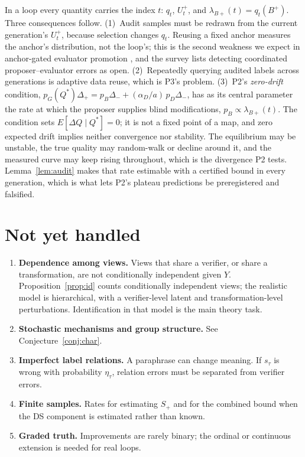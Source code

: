 \documentclass[11pt]{article}
\theoremstyle{definition}
\theoremstyle{remark}
\begin{document}
In a loop every quantity carries the index $t$: $q_t$, $U^+_t$, and $\lambda_{B+}(t)=q_t(B^+)$. Three consequences follow.
(1)~Audit samples must be redrawn from the current generation's $U^+_t$, because selection changes $q_t$. Reusing a fixed anchor measures the anchor's distribution, not the loop's; this is the second weakness we expect in anchor-gated evaluator promotion \cite{rqgm2026}, and the survey \cite{duan2026} lists detecting coordinated proposer--evaluator errors as open.
(2)~Repeatedly querying audited labels across generations is adaptive data reuse, which is P3's problem.
(3)~P2's \emph{zero-drift} condition, $p_G(Q^*)\Delta_+=p_B\Delta_-+(\alpha_D/a)\,p_D\Delta_-$, has as its central parameter the rate at which the proposer supplies blind modifications, $p_B\propto\lambda_{B+}(t)$. The condition sets $E[\Delta Q\mid Q^*]=0$; it is not a fixed point of a map, and zero expected drift implies neither convergence nor stability. The equilibrium may be unstable, the true quality may random-walk or decline around it, and the measured curve may keep rising throughout, which is the divergence P2 tests. Lemma~\ref{lem:audit} makes that rate estimable with a certified bound in every generation, which is what lets P2's plateau predictions be preregistered and falsified.

\section{Not yet handled}\label{sec:open}

\begin{enumerate}
\item \textbf{Dependence among views.} Views that share a verifier, or share a transformation, are not conditionally independent given $Y$. Proposition~\ref{prop:id} counts conditionally independent views; the realistic model is hierarchical, with a verifier-level latent and transformation-level perturbations. Identification in that model is the main theory task.
\item \textbf{Stochastic mechanisms and group structure.} See Conjecture~\ref{conj:char}.
\item \textbf{Imperfect label relations.} A paraphrase can change meaning. If $s_\tau$ is wrong with probability $\eta_\tau$, relation errors must be separated from verifier errors.
\item \textbf{Finite samples.} Rates for estimating $S_+$ and for the combined bound when the DS component is estimated rather than known.
\item \textbf{Graded truth.} Improvements are rarely binary; the ordinal or continuous extension is needed for real loops.
\end{enumerate}
\end{document}
